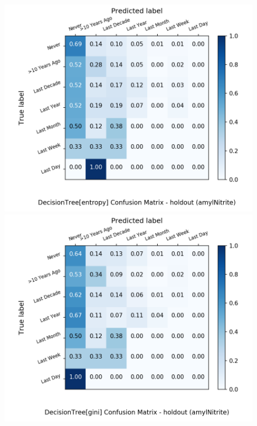 \begin{figure}[H]
	\centering
	\begin{minipage}[b]{0.32\textwidth}
		\includegraphics[width=1.1\textwidth]{Plots/amylNitrite_DecisionTree_entropy_balance_False_holdout.png}
	\end{minipage}
	\begin{minipage}[b]{0.32\textwidth}
		\includegraphics[width=1.1\textwidth]{Plots/amylNitrite_DecisionTree_gini_balance_False_holdout.png}
	\end{minipage}
	\begin{minipage}[b]{0.32\textwidth}

\end{minipage}
\end{figure}
